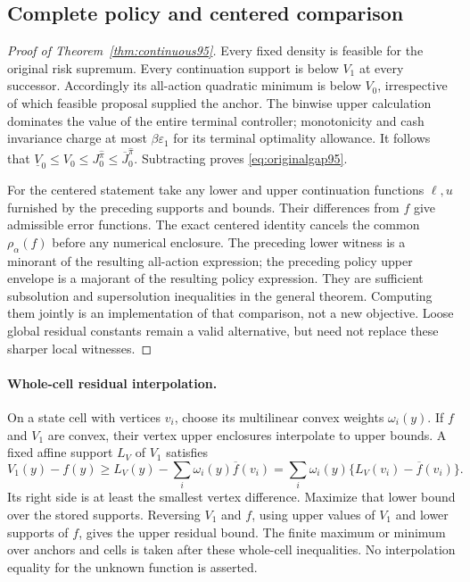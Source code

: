 \subsection{Complete policy and centered comparison}
\begin{proof}[Proof of Theorem~\ref{thm:continuous95}]
Every fixed density is feasible for the original risk supremum. Every continuation support is below $V_1$ at every successor. Accordingly its all-action quadratic minimum is below $V_0$, irrespective of which feasible proposal supplied the anchor. The binwise upper calculation dominates the value of the entire terminal controller; monotonicity and cash invariance charge at most $\beta\varepsilon_1$ for its terminal optimality allowance. It follows that
$\underline V_0\leq V_0\leq J_0^{\widehat\pi}\leq\overline J_0^{\widehat\pi}$.
Subtracting proves \eqref{eq:originalgap95}.

For the centered statement take any lower and upper continuation functions $\ell,u$ furnished by the preceding supports and bounds. Their differences from $f$ give admissible error functions. The exact centered identity cancels the common $\rho_\alpha(f)$ before any numerical enclosure. The preceding lower witness is a minorant of the resulting all-action expression; the preceding policy upper envelope is a majorant of the resulting policy expression. They are sufficient subsolution and supersolution inequalities in the general theorem. Computing them jointly is an implementation of that comparison, not a new objective. Loose global residual constants remain a valid alternative, but need not replace these sharper local witnesses.
\end{proof}

\paragraph{Whole-cell residual interpolation.}
On a state cell with vertices $v_i$, choose its multilinear convex weights $\omega_i(y)$. If $f$ and $V_1$ are convex, their vertex upper enclosures interpolate to upper bounds. A fixed affine support $L_V$ of $V_1$ satisfies
\[
 V_1(y)-f(y)\geq L_V(y)-\sum_i\omega_i(y)\overline f(v_i)
 =\sum_i\omega_i(y)\{L_V(v_i)-\overline f(v_i)\}.
\]
Its right side is at least the smallest vertex difference. Maximize that lower bound over the stored supports. Reversing $V_1$ and $f$, using upper values of $V_1$ and lower supports of $f$, gives the upper residual bound. The finite maximum or minimum over anchors and cells is taken after these whole-cell inequalities. No interpolation equality for the unknown function is asserted.

